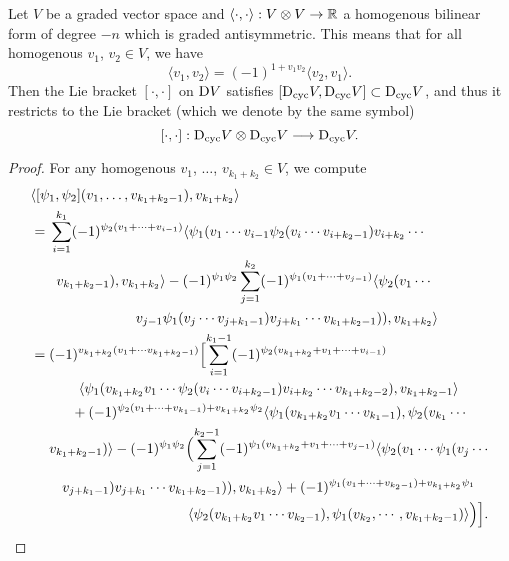 \documentclass[\MainFolder/Text.tex]{subfiles}
\begin{document}
\begin{Lemma}
Let $V$ be a graded vector space and $\langle \cdot,\cdot\rangle: V\otimes V \rightarrow \mathbb{R}$ a homogenous bilinear form of degree $-n$ which is graded antisymmetric. This means that for all homogenous $v_1$, $v_2\in V$, we have
$$ \langle v_1, v_2 \rangle = (-1)^{1+v_1 v_2}\langle v_2, v_1\rangle. $$
Then the Lie bracket $[\cdot,\cdot]$ on $\mathrm{D} V$ satisfies $[\mathrm{D}_{\mathrm{cyc}} V, \mathrm{D}_{\mathrm{cyc}} V]\subset\mathrm{D}_{\mathrm{cyc}} V$, and thus it restricts to the Lie bracket (which we denote by the same symbol) 
$$ [\cdot,\cdot]: \mathrm{D}_{\mathrm{cyc}} V \otimes \mathrm{D}_{\mathrm{cyc}} V \longrightarrow \mathrm{D}_{\mathrm{cyc}} V. $$
\end{Lemma}
\begin{proof}
For any homogenous $v_1$, $\dotsc$, $v_{k_1+k_2} \in V$, we compute
\begin{align*}
&\langle[\psi_1,\psi_2](v_1,\dotsc,v_{k_1+k_2-1}),v_{k_1+k_2}\rangle \\
& = \begin{multlined}[t]\sum_{i=1}^{k_1} (-1)^{\psi_2(v_1+\dotsb+v_{i-1})}\langle \psi_1(v_1 \dotsb v_{i-1}\psi_2(v_i \dotsb v_{i+k_2-1}) v_{i+k_2}\dotsb \\ v_{k_1+k_2-1}), v_{k_1+k_2}\rangle - (-1)^{\psi_1 \psi_2}\sum_{j=1}^{k_2}(-1)^{\psi_1(v_1+\dotsb+v_{j-1})}\langle \psi_2(v_1\dotsb \\ v_{j-1}\psi_1(v_j\dotsb v_{j+k_1-1})v_{j+k_1}\dotsb v_{k_1+k_2-1})), v_{k_1+k_2}\rangle\end{multlined}\\
& = \begin{multlined}[t](-1)^{v_{k_1+k_2}(v_1 + \dotsb v_{k_1+k_2-1})}\Bigl[\sum_{i=1}^{k_1-1} (-1)^{\psi_2(v_{k_1+k_2}+v_1+\dotsb+v_{i-1})}\\ 
\langle \psi_1(v_{k_1+k_2} v_1 \dotsb \psi_2(v_i \dotsb v_{i+k_2-1}) v_{i+k_2}\dotsb v_{k_1+k_2-2}), v_{k_1+k_2-1}\rangle  \\ 
{}+(-1)^{\psi_2(v_1+\dotsb+v_{k_1-1})+v_{k_1+k_2}\psi_2}\langle \psi_1(v_{k_1+k_2} v_1\dotsb v_{k_1-1}),\psi_2(v_{k_1}\dotsb \\ v_{k_1+k_2-1})\rangle - (-1)^{\psi_1 \psi_2}\Bigl(\sum_{j=1}^{k_2-1}(-1)^{\psi_1(v_{k_1+k_2}+v_1+\dotsb+v_{j-1})}\langle \psi_2(v_1\dotsb\psi_1(v_j\dotsb\\ v_{j+k_1-1})v_{j+k_1}\dotsb v_{k_1+k_2-1})), v_{k_1+k_2}\rangle + (-1)^{\psi_1(v_1+\dotsb+v_{k_2-1})+v_{k_1+k_2}\psi_1} \\ \langle \psi_2(v_{k_1+k_2} v_1\dotsb v_{k_2-1}),\psi_1(v_{k_2},\dotsb,v_{k_1+k_2-1})\rangle\Bigr)\Bigr].

\end{multlined}
\end{align*}
\end{proof}
\end{document}
